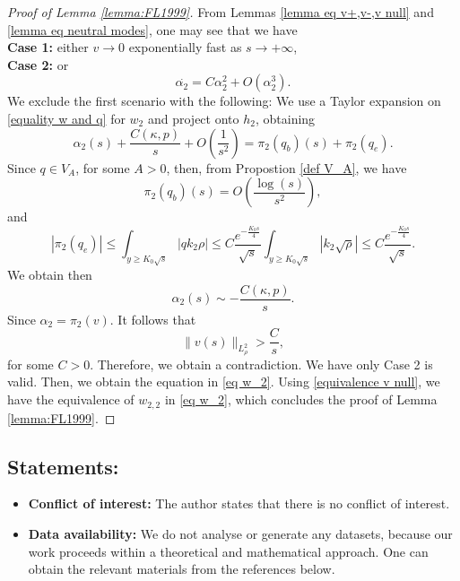 \documentclass[11pt,a4paper]{article}
\newcommand{\1}{\mathbbm{1}}
\numberwithin{equation}{section}
\theoremstyle{remark}
\begin{document}
\begin{proof}[Proof of Lemma \ref{lemma:FL1999}]
From Lemmas \ref{lemma eq v+,v-,v null} and \ref{lemma eq neutral modes}, one may see that we have\\
\textbf{Case 1: }either $v \rightarrow 0$ exponentially fast as $s \rightarrow +\infty$,\\
\textbf{Case 2:} or 
$$\overset{.}{\alpha_2}=C\alpha_2^2+O(\alpha_2^3).$$
We exclude the first scenario with the following: We use a Taylor expansion on \eqref{equality w and q} for $w_2$ and project onto $h_2$, obtaining
\begin{equation}
\alpha_2(s)+\frac{C(\kappa,p)}{s}+O\left(\frac{1}{s^2}\right)=\pi_2(q_b)(s)+\pi_2(q_e).
\end{equation}
Since $q\in V_A$, for some $A>0$, then, from Propostion \ref{def V_A}, we have
$$\pi_2(q_b)(s)=O\left(\frac{\log (s)}{s^2}\right),$$
and
$$ |\pi_2(q_e)|\leq\int_{y\geq K_0\sqrt{s}}|qk_2\rho|\leq C\frac{e^{-\frac{K_0 s}{4}}}{\sqrt{s}}\int_{y\geq K_0\sqrt{s}}|k_2\sqrt{\rho}|\leq C\frac{e^{-\frac{K_0s}{4}}}{\sqrt{s}}.$$
We obtain then
\begin{equation}\label{equivalence v null}
\alpha_2(s)\sim -\frac{C(\kappa,p)}{s}.
\end{equation}
Since $\alpha_2=\pi_2(v)$. It follows that
$$\|v(s)\|_{L^2_\rho}>\frac{C}{s},$$
for some $C>0$. Therefore, we obtain a contradiction. We have only Case 2 is valid. Then, we obtain the equation in \eqref{eq w_2}. Using \eqref{equivalence v null}, we have the equivalence of $w_{2,2}$ in \eqref{eq w_2}, which concludes the proof of Lemma \ref{lemma:FL1999}.
\end{proof}



\subsection*{Statements:}
\begin{itemize}
    \item  \textbf{Conflict of interest:} The author states that there is no
conflict of interest.\vspace{-0.2cm}
    \item \textbf{Data availability:} We do not analyse or generate any datasets, because our work proceeds within a theoretical and mathematical approach. One can obtain the relevant materials from the references below.
\end{itemize}
\printbibliography
\end{document}
